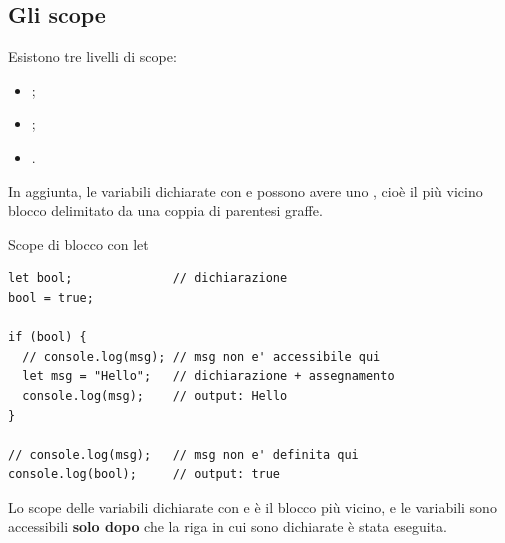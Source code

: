 \subsection{Gli scope}

Esistono tre livelli di scope:

\begin{itemize}
  \item {};
  \item {};
  \item {}.
\end{itemize}

In aggiunta, le variabili dichiarate con  e  possono avere
uno , cioè il più vicino blocco delimitato da una coppia
di parentesi graffe.

\begin{esempio}{Scope di blocco con let}
\begin{affianco}[0.55][c]
\begin{lstlisting}[style=js, name=scope.js]
let bool;              // dichiarazione
bool = true;

if (bool) {
  // console.log(msg); // msg non e' accessibile qui
  let msg = "Hello";   // dichiarazione + assegnamento
  console.log(msg);    // output: Hello
}

// console.log(msg);   // msg non e' definita qui
console.log(bool);     // output: true
\end{lstlisting}
\risultato
\begin{immagine}
\end{immagine}
\end{affianco}

Lo scope delle variabili dichiarate con  e  è il blocco
più vicino, e le variabili sono accessibili \textbf{solo dopo} che la riga in
cui sono dichiarate è stata eseguita.
\end{esempio}

